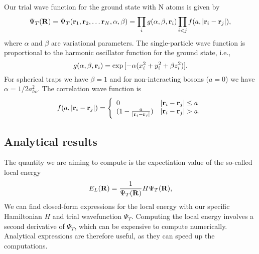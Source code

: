 \documentclass[english, a4paper]{article}
\begin{document}
 Our trial wave function for the ground state with N atoms is given by
  \begin{equation}
 \Psi_T({\bf R})=\Psi_T({\bf r}_1, {\bf r}_2, \dots {\bf r}_N,\alpha,\beta)=\prod_i g(\alpha,\beta,{\bf r}_i)\prod_{i<j}f(a,|{\bf r}_i-{\bf r}_j|),
 \label{eq:trialwf}
 \end{equation}
 where $\alpha$ and $\beta$ are variational parameters.
 The single-particle wave function is proportional to the harmonic
 oscillator function for the ground state, i.e.,
 \begin{equation}
    g(\alpha,\beta,{\bf r}_i)= \exp{[-\alpha(x_i^2+y_i^2+\beta z_i^2)]}.
 \end{equation}
 For spherical traps we have $\beta = 1$ and for non-interacting
 bosons ($a=0$) we have $\alpha = 1/2a_{ho}^2$.  The correlation wave
 function is
 \begin{equation}
    f(a,|{\bf r}_i-{\bf r}_j|)=\Bigg\{
 \begin{array}{ll}
	 0 & {|{\bf r}_i-{\bf r}_j|} \leq {a}\\
	 (1-\frac{a}{|{\bf r}_i-{\bf r}_j|}) & {|{\bf r}_i-{\bf r}_j|} > {a}.
 \end{array}
 \end{equation}
 
 
\subsection*{Analytical results}

The quantity we are aiming to compute is the expectiation value of the so-called local energy
 \begin{equation}
    E_L({\bf R})=\frac{1}{\Psi_T({\bf R})}H\Psi_T({\bf R}),
    \label{localenergy}
 \end{equation}
We can find closed-form expressions for the local energy with our specific Hamiltonian $H$ and trial wavefunction $\Psi_T$.
Computing the local energy involves a second derivative of $\Psi_T$, which can be expensive to compute numerically. 
Analytical expressions are therefore useful, as they can speed up the computations.\\
\end{document}
